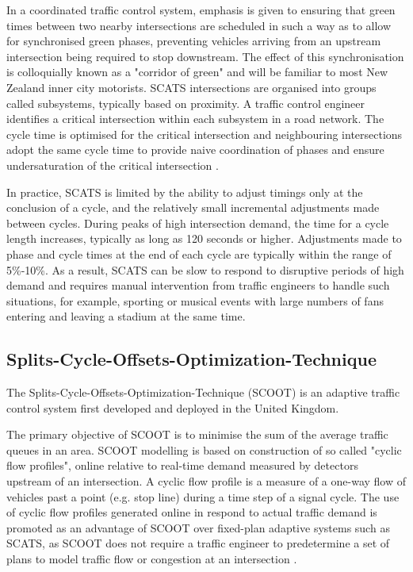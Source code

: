 In a coordinated traffic control system, emphasis is given to ensuring that green times between two nearby intersections are scheduled in such a way as to allow for synchronised green phases, preventing vehicles arriving from an upstream intersection being required to stop downstream. The effect of this synchronisation is colloquially known as a "corridor of green" and will be familiar to most New Zealand inner city motorists. SCATS intersections are organised into groups called subsystems, typically based on proximity. A traffic control engineer identifies a critical intersection within each subsystem in a road network. The cycle time is optimised for the critical intersection and neighbouring intersections adopt the same cycle time to provide naive coordination of phases and ensure undersaturation of the critical intersection \cite{kilby2010rta}.

In practice, SCATS is limited by the ability to adjust timings only at the conclusion of a cycle, and the relatively small incremental adjustments made between cycles. During peaks of high intersection demand, the time for a cycle length increases, typically as long as 120 seconds or higher. Adjustments made to phase and cycle times at the end of each cycle are typically within the range of 5\%-10\%. As a result, SCATS can be slow to respond to disruptive periods of high demand and requires manual intervention from traffic engineers to handle such situations, for example, sporting or musical events with large numbers of fans entering and leaving a stadium at the same time. 

\subsection{Splits-Cycle-Offsets-Optimization-Technique}

The Splits-Cycle-Offsets-Optimization-Technique (SCOOT) is an adaptive traffic control system first developed and deployed in the United Kingdom.

The primary objective of SCOOT is to minimise the sum of the average traffic queues in an area. SCOOT modelling is based on construction of so called "cyclic flow profiles", online relative to real-time demand measured by detectors upstream of an intersection. A cyclic flow profile is a measure of a one-way flow of vehicles past a point (e.g. stop line) during a time step of a signal cycle. The use of cyclic flow profiles generated online in respond to actual traffic demand is promoted as an advantage of SCOOT over fixed-plan adaptive systems such as SCATS, as SCOOT does not require a traffic engineer to predetermine a set of plans to model traffic flow or congestion at an intersection \cite{bell1992future,robertson1991optimizing}.

